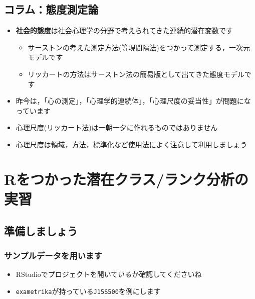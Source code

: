 \documentclass[
  a4paper,
]{ltjsbook}
\providecommand{\tightlist}{%
  \setlength{\itemsep}{0pt}\setlength{\parskip}{0pt}}\usepackage{longtable,booktabs,array}
\begin{document}
\section{コラム：態度測定論}\label{ux30b3ux30e9ux30e0ux614bux5ea6ux6e2cux5b9aux8ad6}

\begin{itemize}
\tightlist
\item
  \textbf{社会的態度}は社会心理学の分野で考えられてきた連続的潜在変数です

  \begin{itemize}
  \tightlist
  \item
    サーストンの考えた測定方法(等現間隔法)をつかって測定する，一次元モデルです
  \item
    リッカートの方法はサーストン法の簡易版として出てきた態度モデルです
  \end{itemize}
\item
  昨今は，「心の測定」，「心理学的連続体」，「心理尺度の妥当性」が問題になっています
\item
  心理尺度(リッカート法)は一朝一夕に作れるものではありません
\item
  心理尺度は領域，方法，標準化など使用法によく注意して利用しましょう
\end{itemize}


\chapter{Rをつかった潜在クラス/ランク分析の実習}\label{rux3092ux3064ux304bux3063ux305fux6f5cux5728ux30afux30e9ux30b9ux30e9ux30f3ux30afux5206ux6790ux306eux5b9fux7fd2}

\section{準備しましょう}\label{ux6e96ux5099ux3057ux307eux3057ux3087ux3046-2}

\subsection{サンプルデータを用います}\label{ux30b5ux30f3ux30d7ux30ebux30c7ux30fcux30bfux3092ux7528ux3044ux307eux3059-1}

\begin{itemize}
\tightlist
\item
  RStudioでプロジェクトを開いているか確認してくださいね
\item
  \texttt{exametrika}が持っている\texttt{J15S500}を例にします
\end{itemize}
\end{document}
